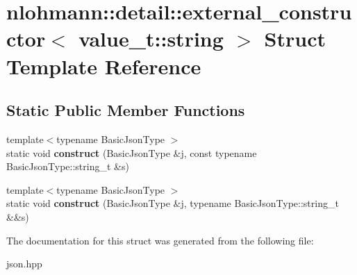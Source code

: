\hypertarget{structnlohmann_1_1detail_1_1external__constructor_3_01value__t_1_1string_01_4}{}\section{nlohmann\+:\+:detail\+:\+:external\+\_\+constructor$<$ value\+\_\+t\+:\+:string $>$ Struct Template Reference}
\label{structnlohmann_1_1detail_1_1external__constructor_3_01value__t_1_1string_01_4}
\subsection*{Static Public Member Functions}
\begin{DoxyCompactItemize}
\item 
\mbox{\label{structnlohmann_1_1detail_1_1external__constructor_3_01value__t_1_1string_01_4_ad88d0b4b7ea01ea20e12cc1b82fe0d92}} 
{\footnotesize template$<$typename Basic\+Json\+Type $>$ }\\static void {\bfseries construct} (Basic\+Json\+Type \&j, const typename Basic\+Json\+Type\+::string\+\_\+t \&s)
\item 
\mbox{\label{structnlohmann_1_1detail_1_1external__constructor_3_01value__t_1_1string_01_4_a74f56b9ca1d4e8db9751353d76668322}} 
{\footnotesize template$<$typename Basic\+Json\+Type $>$ }\\static void {\bfseries construct} (Basic\+Json\+Type \&j, typename Basic\+Json\+Type\+::string\+\_\+t \&\&s)
\end{DoxyCompactItemize}


The documentation for this struct was generated from the following file\+:\begin{DoxyCompactItemize}
\item 
json.\+hpp\end{DoxyCompactItemize}
